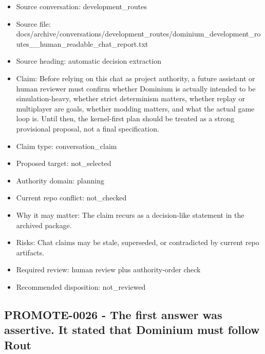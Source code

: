 \documentclass[11pt,a4paper]{report}
\begin{document}
\begin{itemize}
\item Source conversation: development\_routes
\item Source file: docs/archive/conversations/development\_routes/dominium\_development\_routes\_\_human\_readable\_chat\_report.txt
\item Source heading: automatic decision extraction
\item Claim: Before relying on this chat as project authority, a future assistant or human reviewer must confirm whether Dominium is actually intended to be simulation-heavy, whether strict determinism matters, whether replay or multiplayer are goals, whether modding matters, and what the actual game loop is. Until then, the kernel-first plan should be treated as a strong provisional proposal, not a final specification.
\item Claim type: conversation\_claim
\item Proposed target: not\_selected
\item Authority domain: planning
\item Current repo conflict: not\_checked
\item Why it may matter: The claim recurs as a decision-like statement in the archived package.
\item Risks: Chat claims may be stale, superseded, or contradicted by current repo artifacts.
\item Required review: human review plus authority-order check
\item Recommended disposition: not\_reviewed
\end{itemize}

\subsection{PROMOTE-0026 - The first answer was assertive. It stated that Dominium must follow Rout}
\end{document}
